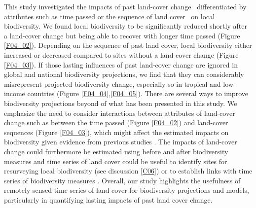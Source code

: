 This study investigated the impacts of past land-cover change \textendash\ differentiated by attributes such as time passed or the sequence of land cover \textendash\ on local biodiversity. We found local biodiversity to be significantly reduced shortly after a land-cover change but being able to recover with longer time passed (Figure \ref{F04_02}). Depending on the sequence of past land cover, local biodiversity either increased or decreased compared to sites without a land-cover change (Figure \ref{F04_03}). If those lasting influences of past land-cover change are ignored in global and national biodiversity projections, we find that they can considerably misrepresent projected biodiversity change, especially so in tropical and low-income countries (Figure \ref{F04_04},\ref{F04_05}). There are several ways to improve biodiversity projections beyond of what has been presented in this study. We emphasize the need to consider interactions between attributes of land-cover change such as between the time passed (Figure \ref{F04_02}) and land-cover sequences (Figure \ref{F04_03}), which might affect the estimated impacts on biodiversity given evidence from previous studies \citep{Chazdon2003,Martin2013}. The impacts of land-cover change could furthermore be estimated using before and after biodiversity measures \citep{DePalma2018} and time series of land cover could be useful to identify sites for resurveying local biodiversity (see discussion \ref{C06}) or to establish links with time series of biodiversity measures \citep{Dornelas2018}. Overall, our study highlights the usefulness of remotely-sensed time series of land cover for biodiversity projections and models, particularly in quantifying lasting impacts of past land cover change.

\clearpage
%

%  

